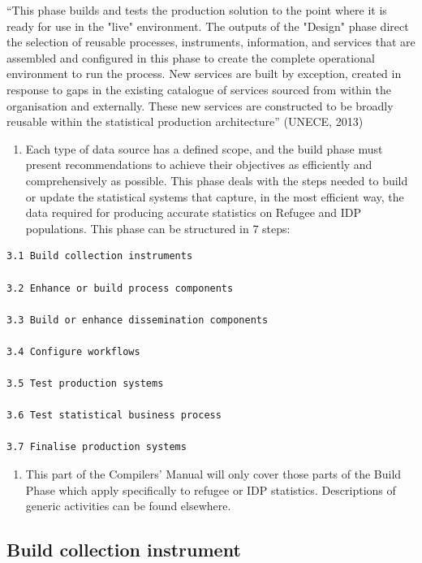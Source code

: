 \documentclass[
]{article}
\providecommand{\tightlist}{%
  \setlength{\itemsep}{0pt}\setlength{\parskip}{0pt}}
\begin{document}
``This phase builds and tests the production solution to the point where
it is ready for use in the "live" environment. The outputs of the
"Design" phase direct the selection of reusable processes,
instruments, information, and services that are assembled and configured
in this phase to create the complete operational environment to run the
process. New services are built by exception, created in response to
gaps in the existing catalogue of services sourced from within the
organisation and externally. These new services are constructed to be
broadly reusable within the statistical production architecture'' (UNECE,
2013)

\begin{enumerate}
\def\labelenumi{\arabic{enumi}.}
\setcounter{enumi}{292}
\tightlist
\item
  Each type of data source has a defined scope, and the build phase
  must present recommendations to achieve their objectives as
  efficiently and comprehensively as possible. This phase deals with
  the steps needed to build or update the statistical systems that
  capture, in the most efficient way, the data required for producing
  accurate statistics on Refugee and IDP populations. This phase can
  be structured in 7 steps:
\end{enumerate}

\begin{verbatim}
3.1 Build collection instruments

3.2 Enhance or build process components

3.3 Build or enhance dissemination components

3.4 Configure workflows

3.5 Test production systems

3.6 Test statistical business process

3.7 Finalise production systems
\end{verbatim}

\begin{enumerate}
\def\labelenumi{\arabic{enumi}.}
\setcounter{enumi}{293}
\tightlist
\item
  This part of the Compilers' Manual will only cover those parts of
  the Build Phase which apply specifically to refugee or IDP
  statistics. Descriptions of generic activities can be found
  elsewhere.
\end{enumerate}

\hypertarget{build-collection-instrument-1}{%
\subsection{Build collection instrument}\label{build-collection-instrument-1}}
\end{document}
